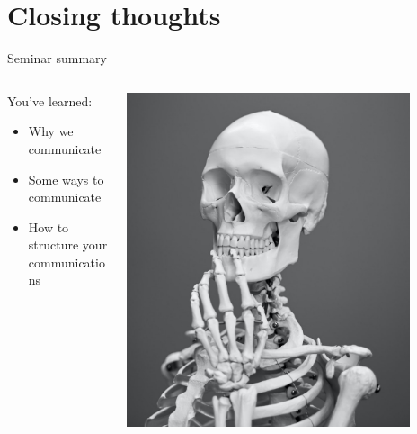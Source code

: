 \section[Closing]{Closing thoughts}
\label{sec:closing}

\begin{frame}{Seminar summary}

	\begin{columns}[c]
		\begin{column}{.45\textwidth}
		    You've learned:
		    \begin{itemize}
			    \item Why we communicate
			    \item Some ways to communicate
			    \item How to structure your communications
		    \end{itemize}
		\end{column}

		\begin{column}{.45\textwidth}
		
		    \includegraphics[width=0.85\textwidth]{images/mathew-schwartz-8rj4sz9YLCI-unsplash-crop.jpg}
		    
		\end{column}
		
	\end{columns}

\end{frame}

